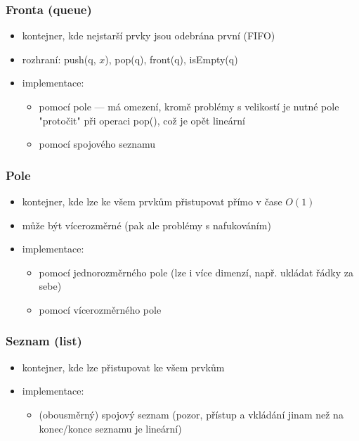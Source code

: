\subsubsection*{Fronta (queue)}
\begin{itemize}
	\item kontejner, kde nejstarší prvky jsou odebrána první (FIFO)
	\item rozhraní: push(q, $x$), pop(q), front(q), isEmpty(q)
	\item implementace:
	\begin{itemize}
		\item pomocí pole --- má omezení, kromě problémy s velikostí je nutné pole "protočit" při operaci pop(), což je opět lineární 
		\item pomocí spojového seznamu
	\end{itemize}
\end{itemize}

\subsubsection*{Pole}
\begin{itemize}
	\item kontejner, kde lze ke všem prvkům přistupovat přímo v čase $O(1)$
	\item může být vícerozměrné (pak ale problémy s nafukováním)
	\item implementace:
	\begin{itemize}
		\item pomocí jednorozměrného pole (lze i více dimenzí, např. ukládat řádky za sebe)
		\item pomocí vícerozměrného pole 
	\end{itemize}
\end{itemize}

\subsubsection*{Seznam (list)}
\begin{itemize}
	\item kontejner, kde lze přistupovat ke všem prvkům
	\item implementace:
	\begin{itemize}
		\item (obousměrný) spojový seznam (pozor, přístup a vkládání jinam než na konec/konce seznamu je lineární)
	\end{itemize}
\end{itemize}

